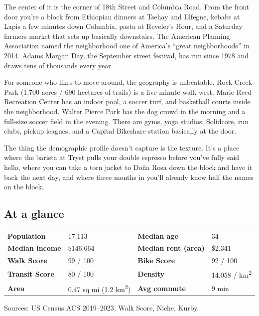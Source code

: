 \documentclass[11pt,a4paper]{article}
\begin{document}
The center of it is the corner of 18th Street and Columbia Road. From the front door you're a block from Ethiopian dinners at Tsehay and Elfegne, kebabs at Lapis a few minutes down Columbia, pasta at Reveler's Hour, and a Saturday farmers market that sets up basically downstairs. The American Planning Association named the neighborhood one of America's ``great neighborhoods'' in 2014. Adams Morgan Day, the September street festival, has run since 1978 and draws tens of thousands every year.

For someone who likes to move around, the geography is unbeatable. Rock Creek Park (1.700 acres / 690 hectares of trails) is a five-minute walk west. Marie Reed Recreation Center has an indoor pool, a soccer turf, and basketball courts inside the neighborhood. Walter Pierce Park has the dog crowd in the morning and a full-size soccer field in the evening. There are gyms, yoga studios, Solidcore, run clubs, pickup leagues, and a Capital Bikeshare station basically at the door.

The thing the demographic profile doesn't capture is the texture. It's a place where the barista at Tryst pulls your double espresso before you've fully said hello, where you can take a torn jacket to Do\~na Rosa down the block and have it back the next day, and where three months in you'll already know half the names on the block.

\subsection*{At a glance}

\begin{statbox}
\renewcommand{\arraystretch}{1.45}
\begin{tabularx}{\linewidth}{@{}lXlX@{}}
\textbf{Population} & 17.113 & \textbf{Median age} & 34 \\
\textbf{Median income} & \$146.664 & \textbf{Median rent (area)} & \$2.341 \\
\textbf{Walk Score} & 99 / 100 & \textbf{Bike Score} & 92 / 100 \\
\textbf{Transit Score} & 80 / 100 & \textbf{Density} & 14.058 / km\textsuperscript{2} \\
\textbf{Area} & 0.47 sq mi (1.2 km\textsuperscript{2}) & \textbf{Avg commute} & 9 min \\
\end{tabularx}
{\footnotesize\color{brandmuted}Sources: US Census ACS 2019--2023, Walk Score, Niche, Kurby.}
\end{statbox}
\end{document}
